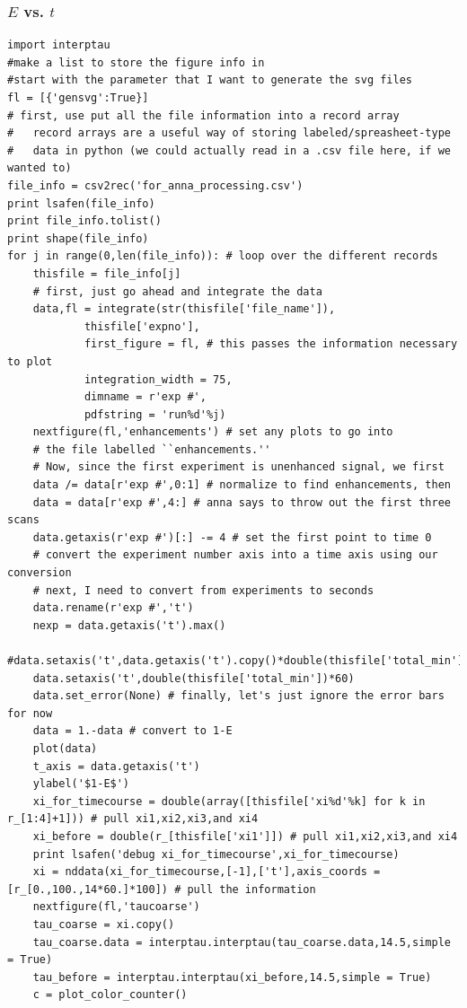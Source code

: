 \subsubsection{$E$ vs. $t$}
\begin{lstlisting}
import interptau
#make a list to store the figure info in
#start with the parameter that I want to generate the svg files
fl = [{'gensvg':True}]
# first, use put all the file information into a record array
#   record arrays are a useful way of storing labeled/spreasheet-type
#   data in python (we could actually read in a .csv file here, if we wanted to)
file_info = csv2rec('for_anna_processing.csv')
print lsafen(file_info)
print file_info.tolist()
print shape(file_info)
for j in range(0,len(file_info)): # loop over the different records
    thisfile = file_info[j]
    # first, just go ahead and integrate the data
    data,fl = integrate(str(thisfile['file_name']),
            thisfile['expno'],
            first_figure = fl, # this passes the information necessary to plot
            integration_width = 75,
            dimname = r'exp #',
            pdfstring = 'run%d'%j)
    nextfigure(fl,'enhancements') # set any plots to go into
    # the file labelled ``enhancements.''
    # Now, since the first experiment is unenhanced signal, we first
    data /= data[r'exp #',0:1] # normalize to find enhancements, then
    data = data[r'exp #',4:] # anna says to throw out the first three scans
    data.getaxis(r'exp #')[:] -= 4 # set the first point to time 0
    # convert the experiment number axis into a time axis using our conversion
    # next, I need to convert from experiments to seconds
    data.rename(r'exp #','t')
    nexp = data.getaxis('t').max()
    #data.setaxis('t',data.getaxis('t').copy()*double(thisfile['total_min'])*60/nexp)
    data.setaxis('t',double(thisfile['total_min'])*60)
    data.set_error(None) # finally, let's just ignore the error bars for now
    data = 1.-data # convert to 1-E
    plot(data)
    t_axis = data.getaxis('t')
    ylabel('$1-E$')
    xi_for_timecourse = double(array([thisfile['xi%d'%k] for k in r_[1:4]+1])) # pull xi1,xi2,xi3,and xi4
    xi_before = double(r_[thisfile['xi1']]) # pull xi1,xi2,xi3,and xi4
    print lsafen('debug xi_for_timecourse',xi_for_timecourse)
    xi = nddata(xi_for_timecourse,[-1],['t'],axis_coords = [r_[0.,100.,14*60.]*100]) # pull the information
    nextfigure(fl,'taucoarse')
    tau_coarse = xi.copy()
    tau_coarse.data = interptau.interptau(tau_coarse.data,14.5,simple = True)
    tau_before = interptau.interptau(xi_before,14.5,simple = True)
    c = plot_color_counter()

\end{lstlisting}
